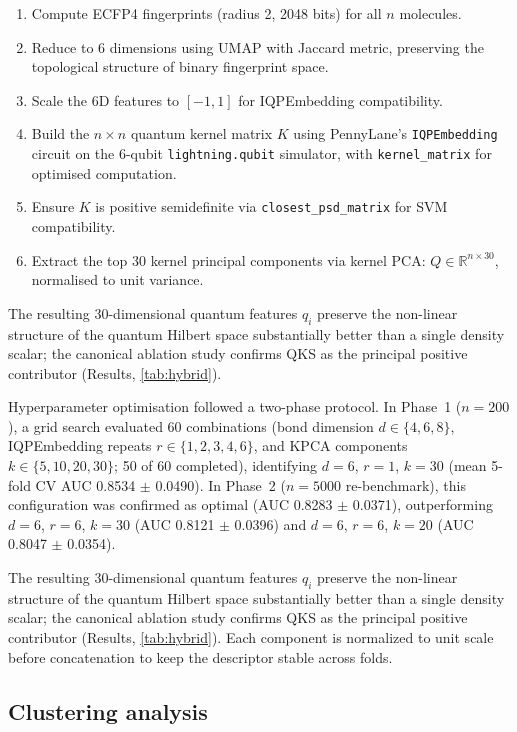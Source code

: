 \documentclass[11pt,a4paper]{article}
\begin{document}
\begin{enumerate}
\item Compute ECFP4 fingerprints (radius 2, \num{2048} bits) for all $n$ molecules.
\item Reduce to 6 dimensions using UMAP with Jaccard metric, preserving the topological structure of binary fingerprint space.
\item Scale the 6D features to $[-1, 1]$ for IQPEmbedding compatibility.
\item Build the $n \times n$ quantum kernel matrix $K$ using PennyLane's \texttt{IQPEmbedding} circuit on the 6-qubit \texttt{lightning.qubit} simulator, with \texttt{kernel\_matrix} for optimised computation.
\item Ensure $K$ is positive semidefinite via \texttt{closest\_psd\_matrix} for SVM compatibility.
\item Extract the top \num{30} kernel principal components via kernel PCA: $Q \in \mathbb{R}^{n \times 30}$, normalised to unit variance.
\end{enumerate}

The resulting 30-dimensional quantum features $q_i$ preserve the non-linear structure of the quantum Hilbert space substantially better than a single density scalar; the canonical ablation study confirms QKS as the principal positive contributor (Results, \cref{tab:hybrid}).

Hyperparameter optimisation followed a two-phase protocol. In Phase~1 ($n = \num{200}$), a grid search evaluated \num{60} combinations (bond dimension $d \in \{4, 6, 8\}$, IQPEmbedding repeats $r \in \{1, 2, 3, 4, 6\}$, and KPCA components $k \in \{5, 10, 20, 30\}$; \num{50} of \num{60} completed), identifying $d = 6$, $r = 1$, $k = 30$ (mean 5-fold CV AUC \num{0.8534} $\pm$ \num{0.0490}). In Phase~2 ($n = \num{5000}$ re-benchmark), this configuration was confirmed as optimal (AUC \num{0.8283} $\pm$ \num{0.0371}), outperforming $d=6$, $r=6$, $k=30$ (AUC \num{0.8121} $\pm$ \num{0.0396}) and $d=6$, $r=6$, $k=20$ (AUC \num{0.8047} $\pm$ \num{0.0354}).

The resulting 30-dimensional quantum features $q_i$ preserve the non-linear structure of the quantum Hilbert space substantially better than a single density scalar; the canonical ablation study confirms QKS as the principal positive contributor (Results, \cref{tab:hybrid}). Each component is normalized to unit scale before concatenation to keep the descriptor stable across folds.

\subsection{Clustering analysis}
\end{document}
